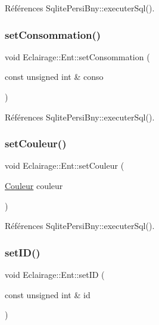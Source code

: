 Références Sqlite\+Persi\+Bny\+::executer\+Sql().

\mbox{\label{classEclairage_1_1Ent_a64c03bcbe84186341b0d9f23e91cdfd8}} 
\subsubsection{\texorpdfstring{set\+Consommation()}{setConsommation()}}
{\footnotesize\ttfamily void Eclairage\+::\+Ent\+::set\+Consommation (\begin{DoxyParamCaption}\item[{const unsigned int \&}]{conso }\end{DoxyParamCaption})\hspace{0.3cm}{\ttfamily [virtual]}}



Références Sqlite\+Persi\+Bny\+::executer\+Sql().

\mbox{\label{classEclairage_1_1Ent_a5f1a309d7e9c51a921a9ffcf8f6343f7}} 
\subsubsection{\texorpdfstring{set\+Couleur()}{setCouleur()}}
{\footnotesize\ttfamily void Eclairage\+::\+Ent\+::set\+Couleur (\begin{DoxyParamCaption}\item[{\hyperlink{Couleur_8h_aa304d0ca681f782b1d7735da33037dd7}{Couleur}}]{couleur }\end{DoxyParamCaption})\hspace{0.3cm}{\ttfamily [virtual]}}



Références Sqlite\+Persi\+Bny\+::executer\+Sql().

\mbox{\label{classEclairage_1_1Ent_a927ff132e908bb3e68dab254f6c2ac2d}} 
\subsubsection{\texorpdfstring{set\+I\+D()}{setID()}}
{\footnotesize\ttfamily void Eclairage\+::\+Ent\+::set\+ID (\begin{DoxyParamCaption}\item[{const unsigned int \&}]{id }\end{DoxyParamCaption})\hspace{0.3cm}{\ttfamily [virtual]}}



